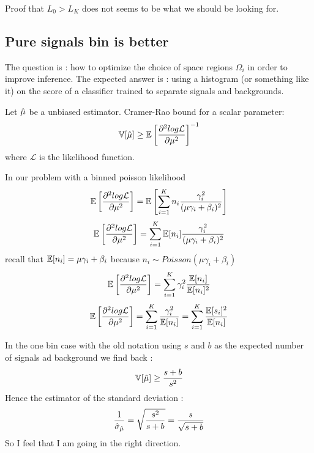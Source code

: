 Proof that $L_0 > L_K$ does not seems to be what we should be looking for.





\subsection{Pure signals bin is better}


The question is : how to optimize the choice of space regions $\Omega_i$ in order to improve inference.
The expected answer is : using a histogram (or something like it) on the score of a classifier trained to separate signals and backgrounds.


Let $\hat\mu$ be a unbiased estimator.
Cramer-Rao bound for a scalar parameter:
\begin{equation}
    \mathbb{V}[\hat\mu] \geq \mathbb{E} \left [ \frac{\partial^2 log \mathcal L}{\partial \mu^2}  \right ]^{-1}
\end{equation}
where $\mathcal L$ is the likelihood function.

In our problem with a binned poisson likelihood
\begin{equation}
    \mathbb{E} \left [ \frac{\partial^2 log \mathcal L}{\partial \mu^2}  \right ] = \mathbb{E} \left[ \sum_{i=1}^K n_i \frac{\gamma_i^2}{(\mu \gamma_i + \beta_i)^2}  \right ]
\end{equation}
\begin{equation}
    \mathbb{E} \left [ \frac{\partial^2 log \mathcal L}{\partial \mu^2}  \right ] = \sum_{i=1}^K \mathbb{E}[n_i] \frac{\gamma_i^2}{(\mu \gamma_i + \beta_i)^2}
\end{equation}
recall that $\mathbb{E}[n_i] = \mu \gamma_i + \beta_i$ because $n_i \sim Poisson(\mu \gamma_i + \beta_i)$ 
\begin{equation}
    \mathbb{E} \left [ \frac{\partial^2 log \mathcal L}{\partial \mu^2}  \right ] = \sum_{i=1}^K  \gamma_i^2 \frac{\mathbb{E}[n_i]}{\mathbb{E}[n_i]^2}
\end{equation}
\begin{equation}
    \mathbb{E} \left [ \frac{\partial^2 log \mathcal L}{\partial \mu^2}  \right ] = \sum_{i=1}^K  \frac{\gamma_i^2}{\mathbb{E}[n_i]} = \sum_{i=1}^K  \frac{\mathbb{E}[s_i]^2}{\mathbb{E}[n_i]}
\end{equation}

In the one bin case with the old notation using $s$ and $b$ as the expected number of signals ad background we find back :
\begin{equation}
    \mathbb{V}[\hat\mu] \geq \frac{s+b}{s^2} 
\end{equation}
Hence the estimator of the standard deviation :
\begin{equation}
    \frac{1}{\hat\sigma_{\hat\mu}} = \sqrt{\frac{s^2}{s+b}} = \frac{s}{\sqrt{s+b}} 
\end{equation}
So I feel that I am going in the right direction.

